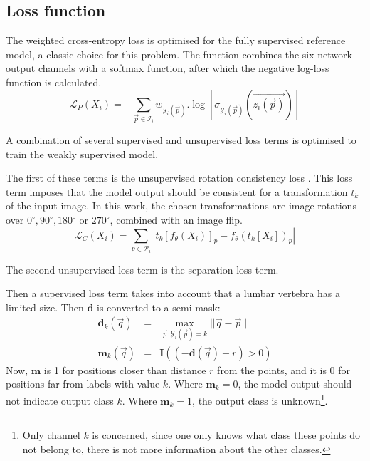 \begin{multicols}{2}
\subsection*{Loss function}
\par{
    The weighted cross-entropy loss is optimised for the fully supervised reference model, a classic choice for this problem.
    The function combines the six network output channels with a softmax function, after which the negative log-loss function is calculated.
}
\begin{equation} \label{eq:crossEntropy}
    \mathcal{L}_P(X_i) = -\sum_{\vec{p} \in \mathcal{I}_i} w_{\mathcal{Y}_i(\vec{p})}.\log\left[\sigma_{\mathcal{Y}_i(\vec{p})}\left(\vec{z_i(\vec{p})}\right)\right]
\end{equation}
\par{
    A combination of several supervised and unsupervised loss terms is optimised to train the weakly supervised model.
}
\par{
    The first of these terms is the unsupervised rotation consistency loss . 
    This loss term imposes that the model output should be consistent for a transformation $t_k$ of the input image.
    In this work, the chosen transformations are image rotations over $0^\circ, 90^\circ, 180^\circ$ or $270^\circ$, combined with an image flip.
}
\begin{equation}
    \mathcal{L}_C(X_i) = \sum_{p \in \mathcal{P}_i} \left| t_k\left[f_\theta(X_i)\right]_p - f_\theta\left( t_k[X_i] \right)_p  \right|  
\end{equation}
\par{
    The second unsupervised loss term is the separation loss term.  
}
\par{
    Then a supervised loss term takes into account that a lumbar vertebra has a limited size.
    Then $\mathbf{d}$ is converted to a semi-mask:
    \begin{eqnarray}
        \mathbf{d}_k(\vec{q}) &=& \max_{\vec{p}:\mathcal{Y}_i(\vec{p})=k}||\vec{q} - \vec{p}||\\
        \mathbf{m}_k(\vec{q}) &=& \mathbf{I}\left( (-\mathbf{d}(\vec{q}) + r) > 0 \right)
    \end{eqnarray}
    Now, $\mathbf{m}$ is 1 for positions closer than distance $r$ from the points, and it is 0 for positions far from labels with value $k$.
    Where $\mathbf{m}_k=0$, the model output should not indicate output class $k$. Where $\mathbf{m}_k=1$, the output class is unknown\footnote{Only channel $k$ is concerned, since one only knows what class these points do not belong to, there is not more information about the other classes.}.

}
\end{multicols}

